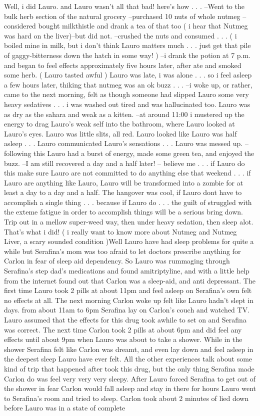 \documentclass[12pt]{book}
\begin{document}
Well, i did Lauro. and Lauro wasn't all that bad! here's how . . .  --Went to the bulk herb section of the natural grocery --purchased 10 nuts of whole nutmeg --considered bought milkthistle and drank a tea of that too ( i hear that Nutmeg was hard on the liver)--but did not. --crushed the nuts and consumed . . .  ( i boiled mine in milk, but i don't think Lauro matters much . . .  just get that pile of gaggy-bitterness down the hatch in some way! ) --i drank the potion at 7 p.m. and began to feel effects approximately five hours later, after ate and smoked some herb. ( Lauro tasted awful ) Lauro was late, i was alone . . .  so i feel asleep a few hours later, thiking that nutmeg was an ok buzz . . .  --i woke up, or rather, came to the next morning, felt as though someone had slipped Lauro some very heavy sedatives . . .  i was washed out tired and was hallucinated too. Lauro was as dry as the sahara and weak as a kitten. --at around 11:00 i mustered up the energy to drag Lauro's weak self into the bathroom, where Lauro looked at Lauro's eyes. Lauro was little slits, all red. Lauro looked like Lauro was half asleep . . .  Lauro communicated Lauro's sensations . . .  Lauro was messed up. --following this Lauro had a burst of energy, made some green tea, and enjoyed the buzz. --I am still recovered a day and a half later! -- believe me . . .  if Lauro do this make sure Lauro are not committed to do anything else that weekend . . .  if Lauro are anything like Lauro, Lauro will be transformed into a zombie for at least a day to a day and a half. The hangover was cool, if Lauro dont have to accomplish a single thing . . .  because if Lauro do . . .  the guilt of struggled with the exteme fatigue in order to accomplish things will be a serious bring down. Trip out in a mellow super-weed way, then under heavy sedation, then sleep alot. That's what i did! ( i really want to know more about Nutmeg and Nutmeg Liver, a scary sounded condition )Well Lauro have had sleep problems for quite a while but Serafina's mom was too afraid to let doctors prescribe anything for Carlon in fear of sleep aid dependency. So Lauro was rummaging through Serafina's step dad's medications and found amitriptyline, and with a little help from the internet found out that Carlon was a sleep-aid, and anti depressant. The first time Lauro took 2 pills at about 11pm and feel asleep on Serafina's own felt no effects at all. The next morning Carlon woke up felt like Lauro hadn't slept in days. from about 11am to 6pm Serafina lay on Carlon's couch and watched TV. Lauro assumed that the effects for this drug took awhile to set on and Serafina was correct. The next time Carlon took 2 pills at about 6pm and did feel any effects until about 9pm when Lauro was about to take a shower. While in the shower Serafina felt like Carlon was dreamt, and even lay down and feel asleep in the deepest sleep Lauro have ever felt. All the other experiences talk about some kind of trip that happened after took this drug, but the only thing Serafina made Carlon do was feel very very very sleepy. After Lauro forced Serafina to get out of the shower in fear Carlon would fall asleep and stay in there for hours Lauro went to Serafina's room and tried to sleep. Carlon took about 2 minutes of lied down before Lauro was in a state of complete 
\end{document}
